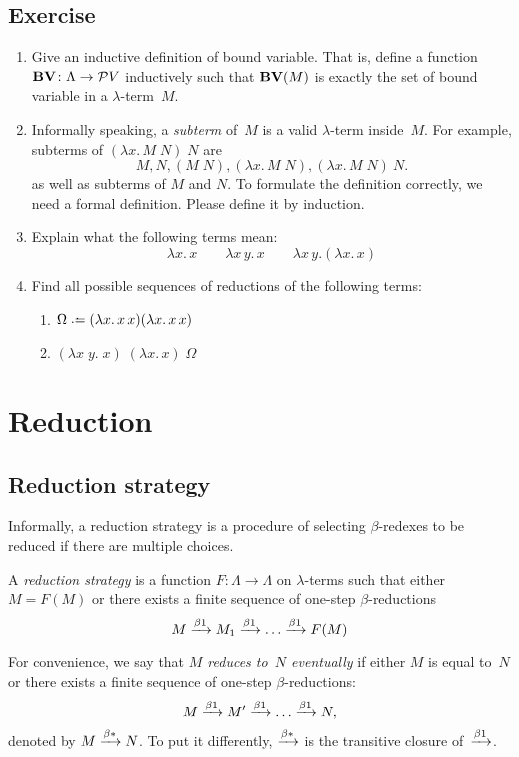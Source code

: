 \subsection*{Exercise}
\begin{enumerate}
  \item Give an inductive definition of bound variable. That is, define a
    function $\mathbf{BV}\colon \Lambda \to \mathcal{P}V$ inductively
    such that $\mathbf{BV}(M)$ is exactly the set of bound variable in a
    $\lambda$-term~$M$.
  \item Informally speaking, a \emph{subterm} of~$M$ is a valid $\lambda$-term
    inside~$M$. For example, subterms of $(\lambda x.\, M\;N)\;N$ are
    \[
      M, N, (M\;N), (\lambda x.\, M\;N), (\lambda x.\, M\;N)\:N.
    \]
    as well as subterms of $M$ and $N$.
    To formulate the definition correctly, we need a formal definition. Please
    define it by induction.
  \item Explain what the following terms mean:
    \[
      \lambda x.\,x
      \qquad
      \lambda x\,y.\,x
      \qquad
      \lambda x\,y. (\lambda x.\, x)
    \]
  \item Find all possible sequences of reductions of the following terms:
    \begin{enumerate}
      \item  $\Omega \defeq (\lambda x.\, x\,x)(\lambda x.\,x\,x)$
      \item  $(\lambda x\;y.\;x)\;(\lambda x.\,x)\;\Omega$
    \end{enumerate}
\end{enumerate}

\section{Reduction}
\subsection{Reduction strategy}
Informally, a reduction strategy is a procedure of selecting $\beta$-redexes
to be reduced if there are multiple choices. 
\begin{definition}
  A \emph{reduction strategy} is a function $F\colon\Lambda\to\Lambda$ on
  $\lambda$-terms such that either $M = F(M)$ or there
  exists a finite sequence of one-step $\beta$-reductions
      \[
        M \xrightarrow{\beta1} M_1 \xrightarrow{\beta1} \dots \xrightarrow{\beta1} F(M)
      \]
\end{definition}
For convenience, we say that \emph{$M$ reduces to~$N$ eventually} if either $M$
is equal to~$N$ or there exists a finite sequence of one-step
$\beta$-reductions:
\[
  M \xrightarrow{\beta1} M' \xrightarrow{\beta1} \dots \xrightarrow{\beta1} N,
\]
denoted by $M \xrightarrow{\beta*} N$. To put it differently, $\xrightarrow{\beta*}$ is the transitive
closure of~$\xrightarrow{\beta1}$.

